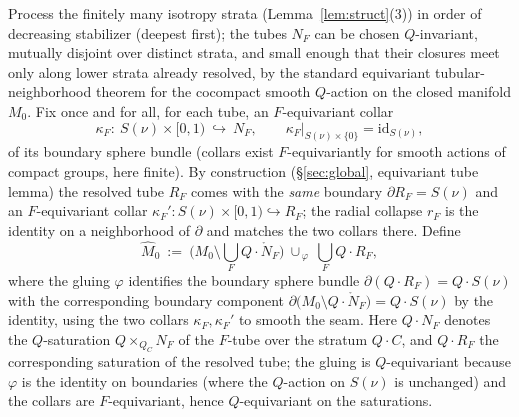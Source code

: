 \documentclass[12pt]{article}
\theoremstyle{definition}
\begin{document}
Process the finitely many isotropy strata (Lemma~\ref{lem:struct}(3)) in order
of decreasing stabilizer (deepest first); the tubes $N_F$ can be chosen
$Q$-invariant, mutually disjoint over distinct strata, and small enough that
their closures meet only along lower strata already resolved, by the standard
equivariant tubular-neighborhood theorem for the cocompact smooth $Q$-action on
the closed manifold $M_0$. Fix once and for all, for each tube, an
$F$-equivariant collar
\[
   \kappa_F\colon\ S(\nu)\times[0,1)\ \hookrightarrow\ N_F,\qquad
   \kappa_F|_{S(\nu)\times\{0\}}=\mathrm{id}_{S(\nu)},
\]
of its boundary sphere bundle (collars exist $F$-equivariantly for smooth
actions of compact groups, here finite). By construction (\S\ref{sec:global},
equivariant tube lemma) the resolved tube $R_F$ comes with the \emph{same}
boundary $\partial R_F=S(\nu)$ and an $F$-equivariant collar
$\kappa_F'\colon S(\nu)\times[0,1)\hookrightarrow R_F$; the radial collapse
$r_F$ is the identity on a neighborhood of $\partial$ and matches the two collars
there. Define
\[
   \widehat M_0\ :=\ \Big(M_0\setminus\textstyle\bigcup_F Q\!\cdot\!\mathring N_F\Big)
   \ \cup_{\,\varphi}\ \textstyle\bigcup_F Q\!\cdot\! R_F,
\]
where the gluing $\varphi$ identifies the boundary sphere bundle
$\partial(Q\cdot R_F)=Q\cdot S(\nu)$ with the corresponding boundary component
$\partial\big(M_0\setminus Q\cdot\mathring N_F\big)=Q\cdot S(\nu)$ by the
identity, using the two collars $\kappa_F,\kappa_F'$ to smooth the seam. Here
$Q\cdot N_F$ denotes the $Q$-saturation $Q\times_{Q_C}N_F$ of the $F$-tube over
the stratum $Q\cdot C$, and $Q\cdot R_F$ the corresponding saturation of the
resolved tube; the gluing is $Q$-equivariant because $\varphi$ is the identity on
boundaries (where the $Q$-action on $S(\nu)$ is unchanged) and the collars are
$F$-equivariant, hence $Q$-equivariant on the saturations.
\end{document}
